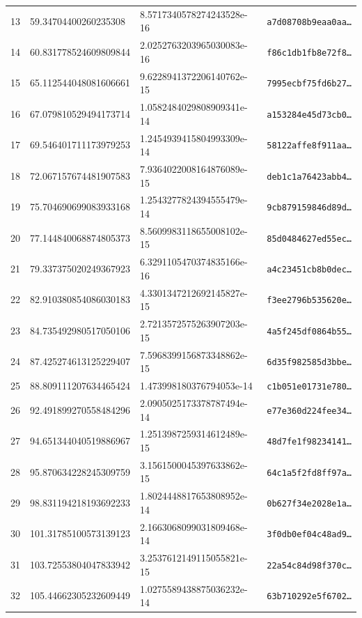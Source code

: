 \documentclass[11pt]{article}
\begin{document}
\begin{center}
\begin{longtable}{rlll}
13 & 59.34704400260235308 & 8.5717340578274243528e-16 & \texttt{a7d08708b9eaa0aa\dots} \\
14 & 60.831778524609809844 & 2.0252763203965030083e-16 & \texttt{f86c1db1fb8e72f8\dots} \\
15 & 65.112544048081606661 & 9.6228941372206140762e-15 & \texttt{7995ecbf75fd6b27\dots} \\
16 & 67.079810529494173714 & 1.0582484029808909341e-14 & \texttt{a153284e45d73cb0\dots} \\
17 & 69.546401711173979253 & 1.2454939415804993309e-14 & \texttt{58122affe8f911aa\dots} \\
18 & 72.067157674481907583 & 7.9364022008164876089e-15 & \texttt{deb1c1a76423abb4\dots} \\
19 & 75.704690699083933168 & 1.2543277824394555479e-14 & \texttt{9cb879159846d89d\dots} \\
20 & 77.144840068874805373 & 8.5609983118655008102e-15 & \texttt{85d0484627ed55ec\dots} \\
21 & 79.337375020249367923 & 6.3291105470374835166e-16 & \texttt{a4c23451cb8b0dec\dots} \\
22 & 82.910380854086030183 & 4.3301347212692145827e-15 & \texttt{f3ee2796b535620e\dots} \\
23 & 84.735492980517050106 & 2.7213572575263907203e-15 & \texttt{4a5f245df0864b55\dots} \\
24 & 87.425274613125229407 & 7.5968399156873348862e-15 & \texttt{6d35f982585d3bbe\dots} \\
25 & 88.809111207634465424 & 1.473998180376794053e-14 & \texttt{c1b051e01731e780\dots} \\
26 & 92.491899270558484296 & 2.0905025173378787494e-14 & \texttt{e77e360d224fee34\dots} \\
27 & 94.651344040519886967 & 1.2513987259314612489e-15 & \texttt{48d7fe1f98234141\dots} \\
28 & 95.870634228245309759 & 3.1561500045397633862e-15 & \texttt{64c1a5f2fd8ff97a\dots} \\
29 & 98.831194218193692233 & 1.8024448817653808952e-14 & \texttt{0b627f34e2028e1a\dots} \\
30 & 101.31785100573139123 & 2.1663068099031809468e-14 & \texttt{3f0db0ef04c48ad9\dots} \\
31 & 103.72553804047833942 & 3.2537612149115055821e-15 & \texttt{22a54c84d98f370c\dots} \\
32 & 105.44662305232609449 & 1.0275589438875036232e-14 & \texttt{63b710292e5f6702\dots} \\

\end{longtable}
\end{center}
\end{document}
